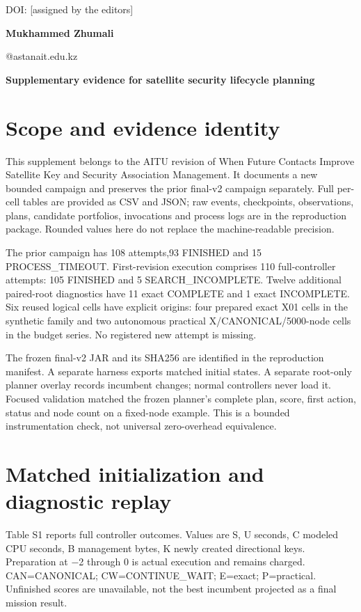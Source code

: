 \documentclass[12pt,a4paper]{article}
\begin{document}
\noindent DOI: [assigned by the editors]\par
\noindent\textbf{Mukhammed Zhumali}\par
{}@astanait.edu.kz\par
\begin{center}\textbf{Supplementary evidence for satellite security lifecycle planning}\end{center}
\section*{Scope and evidence identity}
This supplement belongs to the AITU revision of When Future Contacts Improve Satellite Key and Security Association Management. It documents a new bounded campaign and preserves the prior final-v2 campaign separately. Full per-cell tables are provided as CSV and JSON; raw events, checkpoints, observations, plans, candidate portfolios, invocations and process logs are in the reproduction package. Rounded values here do not replace the machine-readable precision.

The prior campaign has 108 attempts,93 FINISHED and 15 PROCESS\_TIMEOUT. First-revision execution comprises 110 full-controller attempts: 105 FINISHED and 5 SEARCH\_INCOMPLETE. Twelve additional paired-root diagnostics have 11 exact COMPLETE and 1 exact INCOMPLETE. Six reused logical cells have explicit origins: four prepared exact X01 cells in the synthetic family and two autonomous practical X/CANONICAL/5000-node cells in the budget series. No registered new attempt is missing.

The frozen final-v2 JAR and its SHA256 are identified in the reproduction manifest. A separate harness exports matched initial states. A separate root-only planner overlay records incumbent changes; normal controllers never load it. Focused validation matched the frozen planner's complete plan, score, first action, status and node count on a fixed-node example. This is a bounded instrumentation check, not universal zero-overhead equivalence.

\section*{Matched initialization and diagnostic replay}
Table S1 reports full controller outcomes. Values are S, U seconds, C modeled CPU seconds, B management bytes, K newly created directional keys. Preparation at $-$2 through 0 is actual execution and remains charged. CAN=CANONICAL; CW=CONTINUE\_WAIT; E=exact; P=practical. Unfinished scores are unavailable, not the best incumbent projected as a final mission result.
\end{document}

